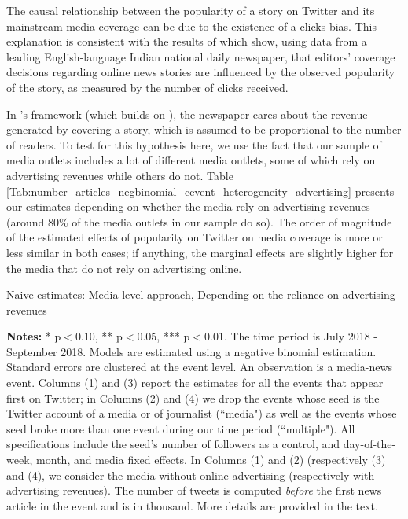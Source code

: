 The causal relationship between the popularity of a story on Twitter and its mainstream media coverage can be due to the existence of a clicks bias. This explanation is consistent with the results of \citet{SenYildirim2015} which show, using data from a leading English-language Indian national daily newspaper, that editors' coverage decisions regarding online news stories are influenced by the observed popularity of the story, as measured by the number of clicks received.

In \citet{SenYildirim2015}'s framework (which builds on \citet{Latham2015}), the newspaper cares about the revenue generated by covering a story, which is assumed to be proportional to the number of readers. To test for this hypothesis here, we use the fact that our sample of media outlets includes a lot of different media outlets, some of which rely on advertising revenues while others do not. Table \ref{Tab:number_articles_negbinomial_cevent_heterogeneity_advertising} presents our estimates depending on whether the media rely on advertising revenues (around 80\% of the media outlets in our sample do so). The order of magnitude of the estimated effects of popularity on Twitter on media coverage is more or less similar in both cases; if anything, the marginal effects are slightly higher for the media that do not rely on advertising online.


\begin{table}
\caption{Naive estimates: Media-level approach, Depending on the reliance on advertising revenues}
\begin{center}
	
\end{center}
\begin{spacing}{0.5}
	{\fns \textbf{Notes:} * p$<$0.10, ** p$<$0.05, *** p$<$0.01. The time period is July 2018 - September 2018. Models are estimated using a negative binomial estimation. Standard errors are clustered at the event level. An observation is a media-news event.  Columns (1) and (3) report the estimates for all the events that appear first on Twitter; in Columns (2) and (4)  we drop the events whose seed is the Twitter account of a media or of journalist (``media") as well as the events whose seed broke more than one event during our time period (``multiple"). All specifications include the seed's number of followers as a control, and day-of-the-week, month, and media fixed effects. In Columns (1) and (2) (respectively (3) and (4), we consider the media without online advertising (respectively with advertising revenues). The number of tweets is computed \textit{before} the first news article in the event and is in thousand. More details are provided in the text.} 
\end{spacing}
\label{Tab:number_articles_negbinomial_cevent_heterogeneity_advertising}
\end{table} 


